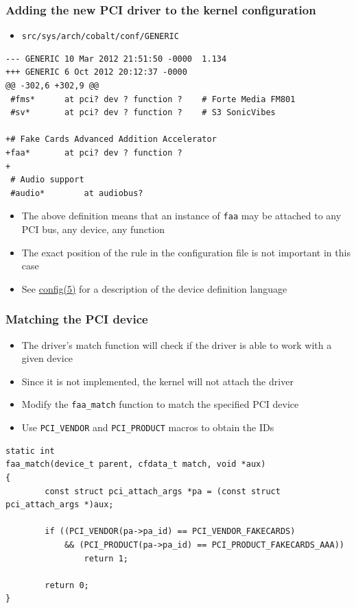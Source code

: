\documentclass[dvipsnames,table]{beamer}
\begin{document}
\begin{frame}[fragile]
\frametitle{Adding the new PCI driver to the kernel configuration}
\scriptsize
\begin{itemize}
	\item {\tt src/sys/arch/cobalt/conf/GENERIC}
\end{itemize}
\begin{verbatim}
--- GENERIC	10 Mar 2012 21:51:50 -0000	1.134
+++ GENERIC	6 Oct 2012 20:12:37 -0000
@@ -302,6 +302,9 @@
 #fms*		at pci? dev ? function ?	# Forte Media FM801
 #sv*		at pci? dev ? function ?	# S3 SonicVibes
 
+# Fake Cards Advanced Addition Accelerator
+faa*		at pci? dev ? function ?
+
 # Audio support
 #audio*		at audiobus?
\end{verbatim}
\normalsize
\begin{itemize}
	\item The above definition means that an instance of {\tt faa} may be attached to any PCI bus, any device, any function
	\item The exact position of the rule in the configuration file is not important in this case
	\item See \href{http://netbsd.gw.com/cgi-bin/man-cgi?config+5+NetBSD-current}{config(5)} for a description of the device definition language
\end{itemize}
\end{frame}

\begin{frame}[fragile]
\frametitle{Matching the PCI device}
\begin{itemize}
	\item The driver's match function will check if the driver is able to work with a given device
 	\item Since it is not implemented, the kernel will not attach the driver
	\item Modify the {\tt faa\_match} function to match the specified PCI device
	\item Use {\tt PCI\_VENDOR} and {\tt PCI\_PRODUCT} macros to obtain the IDs
\end{itemize}
\scriptsize
\begin{lstlisting}
static int
faa_match(device_t parent, cfdata_t match, void *aux)
{
        const struct pci_attach_args *pa = (const struct pci_attach_args *)aux;

        if ((PCI_VENDOR(pa->pa_id) == PCI_VENDOR_FAKECARDS) 
            && (PCI_PRODUCT(pa->pa_id) == PCI_PRODUCT_FAKECARDS_AAA))
                return 1;

        return 0;
}
\end{lstlisting}
\end{frame}
\end{document}
